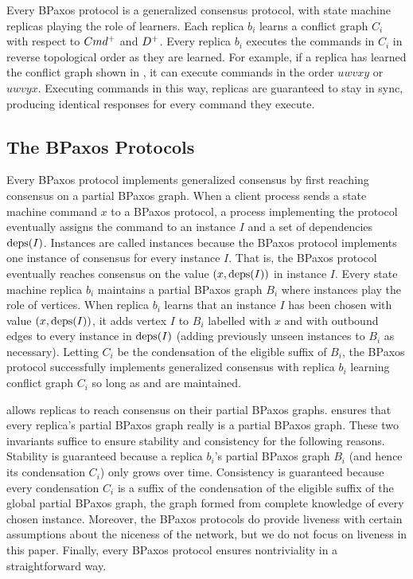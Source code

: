 Every BPaxos protocol is a generalized consensus protocol, with state machine
replicas playing the role of learners. Each replica $b_i$ learns a conflict
graph $C_i$ with respect to $Cmd^+$ and $D^+$. Every replica $b_i$
executes the commands in $C_i$ in reverse topological order as they are
learned. For example, if a replica has learned the conflict graph shown in
, it can execute commands in the order $uwvxy$ or $uwvyx$.
Executing commands in this way, replicas are guaranteed to stay in sync,
producing identical responses for every command they execute.

\subsection{The BPaxos Protocols}
Every BPaxos protocol implements generalized consensus by first reaching
consensus on a partial BPaxos graph.
%
When a client process sends a state machine command $x$ to a BPaxos protocol, a
process implementing the protocol eventually assigns the command to an instance
$I$ and a set of dependencies $\text{deps}(I)$.
%
Instances are called instances because the BPaxos protocol implements one
instance of consensus for every instance $I$. That is, the BPaxos protocol
eventually reaches consensus on the value $(x, \text{deps}(I))$ in instance $I$.
Every state machine replica $b_i$ maintains a partial BPaxos graph $B_i$ where
instances play the role of vertices. When replica $b_i$ learns that an instance
$I$ has been chosen with value $(x, \text{deps}(I))$, it adds vertex $I$ to $B_i$
labelled with $x$ and with outbound edges to every instance in $\text{deps}(I)$
(adding previously unseen instances to $B_i$ as necessary). Letting $C_i$ be
the condensation of the eligible suffix of $B_i$, the BPaxos protocol
successfully implements generalized consensus with replica $b_i$ learning
conflict graph $C_i$ so long as  and
 are maintained.

 allows replicas to reach consensus on their partial
BPaxos graphs.  ensures that every replica's partial
BPaxos graph really is a partial BPaxos graph. These two invariants suffice to
ensure stability and consistency for the following reasons.
%
Stability is guaranteed because a replica $b_i$'s partial BPaxos graph $B_i$
(and hence its condensation $C_i$) only grows over time.
%
Consistency is guaranteed because every condensation $C_i$ is a suffix of the
condensation of the eligible suffix of the global partial BPaxos graph, the
graph formed from complete knowledge of every chosen instance.
%
Moreover, the BPaxos protocols do provide liveness with certain assumptions
about the niceness of the network, but we do not focus on liveness in this
paper.
%
Finally, every BPaxos protocol ensures nontriviality in a straightforward way.

